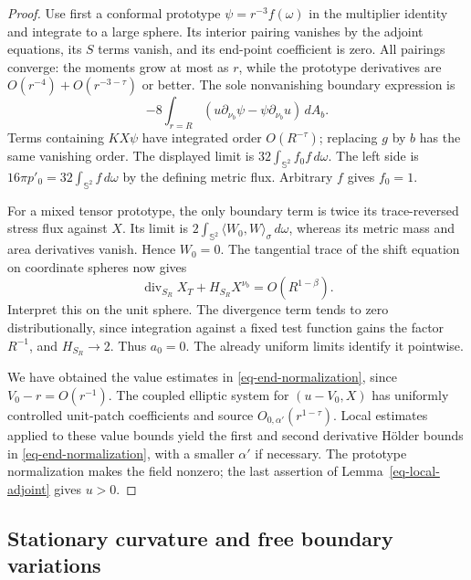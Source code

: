 \begin{proof}
Use first a conformal prototype \(\psi=r^{-3}f(\omega)\) in the
multiplier identity and integrate to a large sphere.  Its interior
pairing vanishes by the adjoint equations, its \(S\) terms vanish,
and its end-point coefficient is zero.  All pairings converge:
the moments grow at most as \(r\), while the prototype derivatives
are \(O(r^{-4})+O(r^{-3-\tau})\) or better.  The sole nonvanishing
boundary expression is
\[
 -8\int_{r=R}
       (u\partial_{\nu_b}\psi-\psi\partial_{\nu_b}u)\,dA_b.
\]
Terms containing \(KX\psi\) have integrated order \(O(R^{-\tau})\);
replacing \(g\) by \(b\) has the same vanishing order.
The displayed limit is \(32\int_{\mathbb S^2}f_0f\,d\omega\).
The left side is \(16\pi p'_0=32\int_{\mathbb S^2}f\,d\omega\)
by the defining metric flux.  Arbitrary \(f\) gives \(f_0=1\).

For a mixed tensor prototype, the only boundary term is twice
its trace-reversed stress flux against \(X\).  Its limit is
\(2\int_{\mathbb S^2}\langle W_0,W\rangle_\sigma\,d\omega\),
whereas its metric mass and area derivatives vanish.  Hence
\(W_0=0\).  The tangential trace of the shift equation on
coordinate spheres now gives
\[
 \operatorname{div}_{S_R}X_T+H_{S_R}X^{\nu_b}
                      =O(R^{1-\beta}).
\]
Interpret this on the unit sphere.  The divergence term tends to
zero distributionally, since integration against a fixed test
function gains the factor \(R^{-1}\), and \(H_{S_R}\to2\).
Thus \(a_0=0\).  The already uniform limits identify it pointwise.

We have obtained the value estimates in
\eqref{eq-end-normalization}, since \(V_0-r=O(r^{-1})\).
The coupled elliptic system for \((u-V_0,X)\) has uniformly
controlled unit-patch coefficients and source
\(O_{0,\alpha'}(r^{1-\tau})\).  Local estimates applied to these
value bounds yield the first and second derivative Hölder bounds
in \eqref{eq-end-normalization}, with a smaller \(\alpha'\) if
necessary.  The prototype normalization makes the field nonzero;
the last assertion of Lemma~\ref{eq-local-adjoint} gives \(u>0\).
\end{proof}

\subsection{Stationary curvature and free boundary variations}

